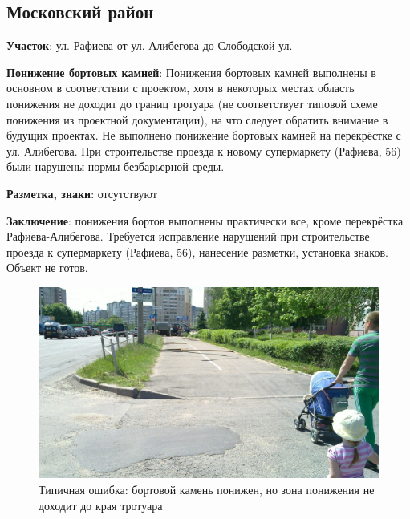 \documentclass[a4paper,14pt,twoside]{extarticle}
\renewcommand\emph[1]{\textbf{#1}}
\begin{document}
\clearpage
\newpage

\subsection*{Московский район}%
\emph{Участок}: ул. Рафиева от ул. Алибегова до Слободской ул.

\emph{Понижение бортовых камней}:
Понижения бортовых камней выполнены в основном в соответствии с проектом, хотя в некоторых местах область понижения не доходит до границ тротуара (не соответствует типовой схеме понижения из проектной документации), на что следует обратить внимание в будущих проектах. Не выполнено понижение бортовых камней на перекрёстке с ул. Алибегова. При строительстве проезда к новому супермаркету (Рафиева, 56) были нарушены нормы безбарьерной среды.

\emph{Разметка, знаки}: отсутствуют

\emph{Заключение}: понижения бортов выполнены практически все, кроме перекрёстка Рафиева-Алибегова. Требуется исправление нарушений при строительстве проезда к супермаркету (Рафиева, 56), нанесение разметки, установка знаков. Объект не готов.

\begin{figure}[h!]
    \centering
    \includegraphics[width=\textwidth]{Pictures/1000000000000A00000005A0F05C02E6.jpg}
    \caption{Типичная ошибка: бортовой камень понижен, но зона понижения не доходит до края тротуара}
\end{figure}
\end{document}
